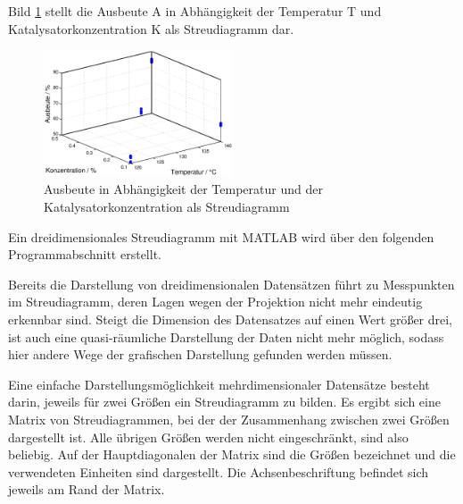 \noindent Bild \ref{fig:ChemischeIndustrie1} stellt die Ausbeute A in Abh\"{a}ngigkeit der Temperatur T und Katalysatorkonzentration K als Streudiagramm dar.

\noindent 
\begin{figure}[H]
  \centerline{\includegraphics[width=0.5\textwidth]{Kapitel7/Bilder/image5}}
  \caption{Ausbeute in Abh\"{a}ngigkeit der Temperatur und der Katalysatorkonzentration als Streudiagramm}
  \label{fig:ChemischeIndustrie1}
\end{figure}

\clearpage 

\noindent Ein dreidimensionales Streudiagramm mit MATLAB wird \"{u}ber den folgenden Programmabschnitt erstellt.



\noindent Bereits die Darstellung von dreidimensionalen Datens\"{a}tzen f\"{u}hrt zu Messpunkten im Streudiagramm, deren Lagen wegen der Projektion nicht mehr eindeutig erkennbar sind. Steigt die Dimension des Datensatzes auf einen Wert gr\"{o}{\ss}er drei, ist auch eine quasi-r\"{a}umliche Darstellung der Daten nicht mehr m\"{o}glich, sodass hier andere Wege der grafischen Darstellung gefunden werden m\"{u}ssen. \newline

\noindent Eine einfache Darstellungsm\"{o}glichkeit mehrdimensionaler Datens\"{a}tze besteht darin, jeweils f\"{u}r zwei Gr\"{o}{\ss}en ein Streudiagramm zu bilden. Es ergibt sich eine Matrix von Streudiagrammen, bei der der Zusammenhang zwischen zwei Gr\"{o}{\ss}en dargestellt ist. Alle \"{u}brigen Gr\"{o}{\ss}en werden nicht eingeschr\"{a}nkt, sind also beliebig. Auf der Hauptdiagonalen der Matrix sind die Gr\"{o}{\ss}en bezeichnet und die verwendeten Einheiten sind dargestellt. Die Achsenbeschriftung befindet sich jeweils am Rand der Matrix.

